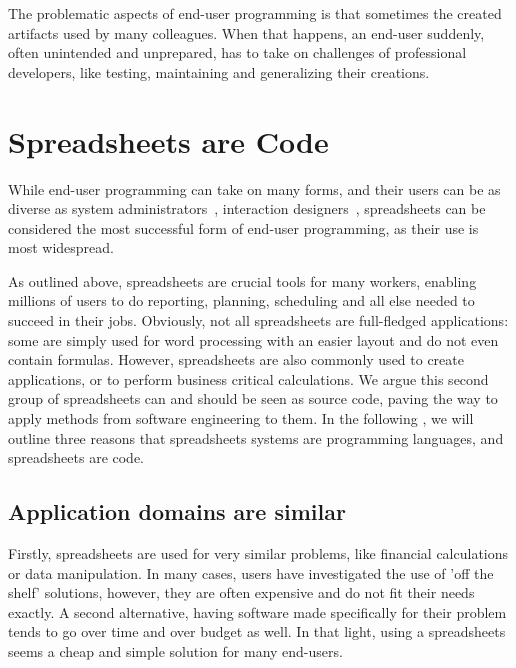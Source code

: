 \documentclass[conference]{IEEEtran}
\begin{document}
The problematic aspects of end-user programming is that sometimes the created artifacts  used by many colleagues. When that happens, an end-user suddenly, often unintended and unprepared, has to take on challenges of professional developers, like testing, maintaining and generalizing their creations. 


\section{Spreadsheets are Code}
While end-user programming can take on many forms, and their users can be as diverse as system administrators~\cite{Barrett2004}, interaction designers~\cite{Ko2004, brandt_opportunistic_2008, myers_how_2008}, spreadsheets can be considered the most successful form of end-user programming, as their use is most widespread.

As outlined above, spreadsheets are crucial tools for many workers, enabling millions of users to do reporting, planning, scheduling and all else needed to succeed in their jobs. Obviously, not all spreadsheets are full-fledged applications: some are simply used for word processing with an easier layout and do not even contain formulas. However, spreadsheets are also commonly used to create applications, or to perform business critical calculations. We argue this second group of spreadsheets can and should be seen as source code, paving the way to apply methods from software engineering to them. In the following , we will outline three reasons that spreadsheets systems are programming languages, and spreadsheets are code.

\subsection{Application domains are similar}
Firstly, spreadsheets are used for very similar problems, like financial calculations or data manipulation. In many cases, users have investigated the use of 'off the shelf' solutions, however, they are often expensive and do not fit their needs exactly. A second alternative, having software made specifically for their problem tends to go over time and over budget as well. In that light, using a spreadsheets seems a cheap and simple solution for many end-users.
\end{document}
